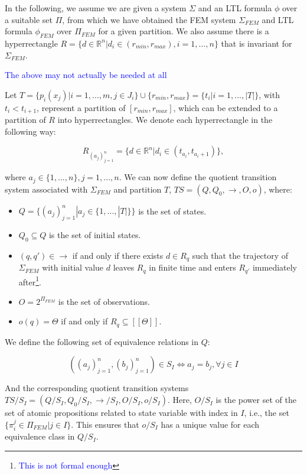 \documentclass{article}
\newcommand*{\R}{\mathbb{R}}
\newcommand*{\fran}[1]{\textcolor{blue}{#1}}
\begin{document}
In the following, we assume we are given a system $\Sigma$ and an LTL formula
$\phi$ over a suitable set $\Pi$, from which we have obtained the 
FEM system $\Sigma_{FEM}$ and LTL formula $\phi_{FEM}$ over $\Pi_{FEM}$ for a
given partition. We also assume there is a hyperrectangle $R = \{d \in \R^n |
d_i \in (r_{min}, r_{max}), i = 1,...,n\}$ that is invariant for $\Sigma_{FEM}$.

\fran{The above may not actually be needed at all}

Let $T = \{ p_i(x_j) | i = 1,...,m, j \in J_i \} \cup \{r_{min}, r_{max}\} =
\{t_i | i = 1,..., |T|\}$, with $t_i < t_{i+1}$, represent a partition of $[r_{min},
r_{max}]$, which can be extended to a partition of $R$ into hyperrectangles. We
denote each hyperrectangle in the following way:

\begin{equation}
    R_{(a_j)_{j=1}^n} = \{d \in \R^n | d_i \in (t_{a_i}, t_{a_i + 1})\},
\end{equation}

where $a_j \in \{1,...,n\}, j=1,...,n$. We can now define the quotient
transition system associated with $\Sigma_{FEM}$ and partition $T$,
$TS = (Q, Q_0, \rightarrow, O, o)$, where:

\begin{itemize}
    \item $Q = \{(a_j)_{j=1}^n | a_j \in \{1,...,|T|\}\}$ is the set of states.
    \item $Q_0 \subseteq Q$ is the set of initial states.
    \item $(q,q') \in \rightarrow$ if and only if there exists $d \in R_q$ such
        that the trajectory of $\Sigma_{FEM}$ with initial value $d$ leaves
        $R_q$ in finite time and enters $R_{q'}$ immediately
        after\footnote{\fran{This is not formal enough}}.
    \item $O = 2^{\Pi_{FEM}}$ is the set of observations.
    \item $o(q) = \Theta$ if and only if $R_q \subseteq [[\Theta]]$.
\end{itemize}

We define the following set of equivalence relations in $Q$:

\begin{equation}
    ((a_j)_{j=1}^n,(b_j)_{j=1}^n) \in S_I \iff a_j = b_j, \forall j \in I
\end{equation}

And the corresponding quotient transition systems $TS/S_I = (Q/S_I, Q_0/S_I,
\to/S_I, O/S_I, o/S_I)$. Here, $O/S_I$ is the power set of the set of atomic
propositions related to state variable with index in $I$, i.e., the set
$\{\pi_i^j \in \Pi_{FEM} | j \in I \}$. This ensures that $o/S_I$ has a unique
value for each equivalence class in $Q/S_I$.
\end{document}
